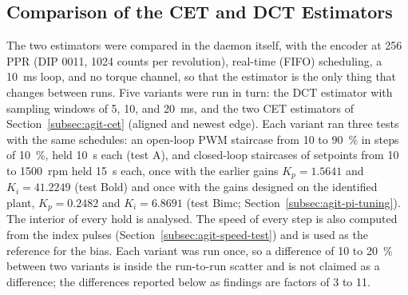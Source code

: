 
\subsection{Comparison of the CET and DCT Estimators}
\label{subsec:agit-cetdct}

The two estimators were compared in the daemon itself, with the encoder at 256 PPR (DIP 0011, 1024 counts per revolution), real-time (FIFO) scheduling, a 10~ms loop, and no torque channel, so that the estimator is the only thing that changes between runs. Five variants were run in turn: the DCT estimator with sampling windows of 5, 10, and 20~ms, and the two CET estimators of Section~\ref{subsec:agit-cet} (aligned and newest edge). Each variant ran three tests with the same schedules: an open-loop PWM staircase from 10 to 90~\% in steps of 10~\%, held 10~s each (test A), and closed-loop staircases of setpoints from 10 to 1500~rpm held 15~s each, once with the earlier gains $K_p = 1.5641$ and $K_i = 41.2249$ (test Bold) and once with the gains designed on the identified plant, $K_p = 0.2482$ and $K_i = 6.8691$ (test Bimc; Section~\ref{subsec:agit-pi-tuning}). The interior of every hold is analysed. The speed of every step is also computed from the index pulses (Section~\ref{subsec:agit-speed-test}) and is used as the reference for the bias. Each variant was run once, so a difference of 10 to 20~\% between two variants is inside the run-to-run scatter and is not claimed as a difference; the differences reported below as findings are factors of 3 to 11.

